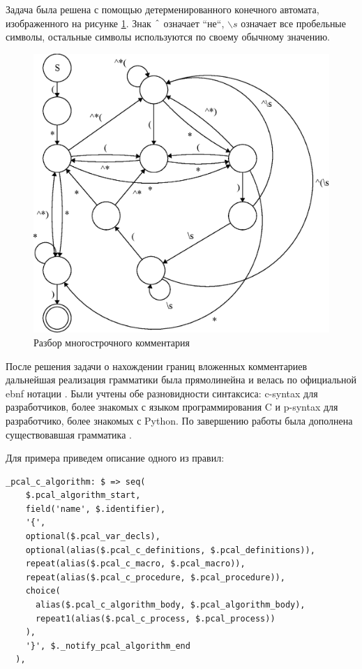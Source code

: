 \documentclass[14pt, openany]{report}
\begin{document}
Задача была решена с помощью детерменированного конечного автомата, изображенного на рисунке \ref{fig:blockComment}. Знак \(\char`^\) означает ``не``, \(\backslash s\) означает все пробельные символы, остальные символы используются по своему обычному значению.

\newpage

\begin{figure}[h]
  \includegraphics[scale=0.9]{blockComment}
  \caption{Разбор многострочного комментария}
  \label{fig:blockComment}
\end{figure}

После решения задачи о нахождении границ вложенных комментариев дальнейшая реализация грамматики была прямолинейна и велась по официальной ebnf нотации \cite{pcalEbnf}. Были учтены обе разновидности синтаксиса: c-syntax для разработчиков, более знакомых с языком программирования C и p-syntax для разработчико, более знакомых с Python. По завершению работы была дополнена существовавшая грамматика \cite{pcalGrammar}.

Для примера приведем описание одного из правил:

\begin{lstlisting}[label=listing:empty-element-class, caption=Правило tree-sitter грамматики для PlusCal C-syntax алгоритма, captionpos=b, style=progStyle]
  _pcal_c_algorithm: $ => seq(
    $.pcal_algorithm_start,
    field('name', $.identifier),
    '{',
    optional($.pcal_var_decls),
    optional(alias($.pcal_c_definitions, $.pcal_definitions)),
    repeat(alias($.pcal_c_macro, $.pcal_macro)),
    repeat(alias($.pcal_c_procedure, $.pcal_procedure)),
    choice(
      alias($.pcal_c_algorithm_body, $.pcal_algorithm_body),
      repeat1(alias($.pcal_c_process, $.pcal_process))
    ),
    '}', $._notify_pcal_algorithm_end
  ),
\end{lstlisting}
\end{document}
